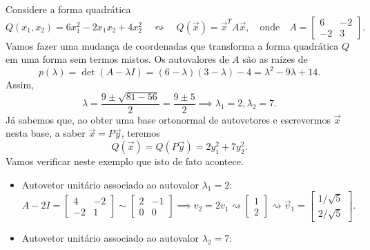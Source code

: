 \documentclass[../livro.tex]{subfiles}
\begin{document}
\begin{example}
	Considere a forma quadrática
	\begin{equation}
	Q(x_1, x_2) = 6x_1^2 - 2 x_1x_2 + 4 x_2^2 \quad \leftrightsquigarrow \quad Q(\vec{x}) = \vec{x}^T A \vec{x}, \quad \text{onde} \quad
	A = 
	\begin{bmatrix}
	6 & -2 \\
	-2 &  3
	\end{bmatrix}.
	\end{equation} Vamos fazer uma mudança de coordenadas que transforma a forma quadrática $Q$ em uma forma sem termos mistos. Os autovalores de $A$ são as raízes de
	\begin{equation}
	p(\lambda) = \det (A- \lambda I) = (6 - \lambda)(3 - \lambda) - 4 = \lambda^2 - 9 \lambda + 14.
	\end{equation} Assim,
	\begin{equation}
	\lambda = \frac{9 \pm \sqrt{81 - 56}}{2} = \frac{9 \pm 5}{2} \implies \lambda_1 = 2, \lambda_2 = 7.
	\end{equation} Já sabemos que, ao obter uma base ortonormal de autovetores e escrevermos $\vec{x}$ nesta base, a saber $\vec{x} = P\vec{y}$, teremos
	\begin{equation}
	Q(\vec{x}) = Q (P\vec{y}) = 2 y_1^2 + 7 y_2^2.
	\end{equation} Vamos verificar neste exemplo que isto de fato acontece.
	\begin{itemize}
		\item Autovetor unitário associado ao autovalor $\lambda_1 = 2$:
		\begin{equation}
		A -2I = 
		\begin{bmatrix}
		4 & -2 \\
		-2 &  1
		\end{bmatrix} \sim 
		\begin{bmatrix}
		2 & -1 \\
		0 &  0
		\end{bmatrix} \implies v_2 = 2v_1 \rightsquigarrow 
		\begin{bmatrix}
		1 \\ 2
		\end{bmatrix} \rightsquigarrow
		\vec{v}_1 = \begin{bmatrix}
		1/\sqrt{5} \\ 2/\sqrt{5}
		\end{bmatrix} .
		\end{equation}
		\item Autovetor unitário associado ao autovalor $\lambda_2 = 7$:

\end{itemize}
\end{example}
\end{document}
